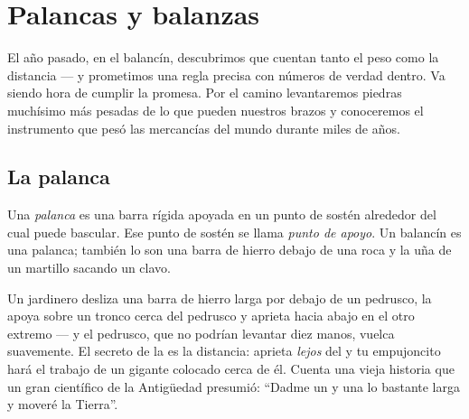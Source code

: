 \chapter{Palancas y balanzas}\label{ch:g3:levers-and-scales}

El año pasado, en el balancín, descubrimos que cuentan tanto el peso
como la distancia --- y prometimos una regla precisa con números de
verdad dentro. Va siendo hora de cumplir la promesa. Por el camino
levantaremos piedras muchísimo más pesadas de lo que pueden nuestros
brazos y conoceremos el instrumento que pesó las mercancías del mundo
durante miles de años.

\section{La palanca}

\begin{definition}\label{def:g3:levers-and-scales:lever}
Una \emph{palanca} es una barra rígida apoyada en un
punto de sostén alrededor del cual puede bascular. Ese punto de
sostén se llama \emph{punto de apoyo}.
Un balancín es una palanca; también lo son una barra de hierro debajo
de una roca y la uña de un martillo sacando un clavo.
\end{definition}

\begin{example}\label{ex:g3:levers-and-scales:crowbar}
Un jardinero desliza una barra de hierro larga por debajo de un
pedrusco, la apoya sobre un tronco cerca del pedrusco y aprieta hacia
abajo en el otro extremo --- y el pedrusco, que no podrían levantar
diez manos, vuelca suavemente. El secreto de la  es la
distancia: aprieta \emph{lejos} del  y tu empujoncito
hará el trabajo de un gigante colocado cerca de él. Cuenta una vieja
historia que un gran científico de la Antigüedad presumió: ``Dadme un
 y una  lo bastante larga y moveré la Tierra''.
\end{example}

